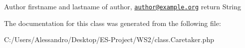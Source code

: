 \begin{DoxyAuthor}{Author}
firstname and lastname of author, \href{mailto:author@example.org}{\tt author@example.\+org} return String 
\end{DoxyAuthor}


The documentation for this class was generated from the following file\+:\begin{DoxyCompactItemize}
\item 
C\+:/\+Users/\+Alessandro/\+Desktop/\+E\+S-\/\+Project/\+W\+S2/class.\+Caretaker.\+php\end{DoxyCompactItemize}
